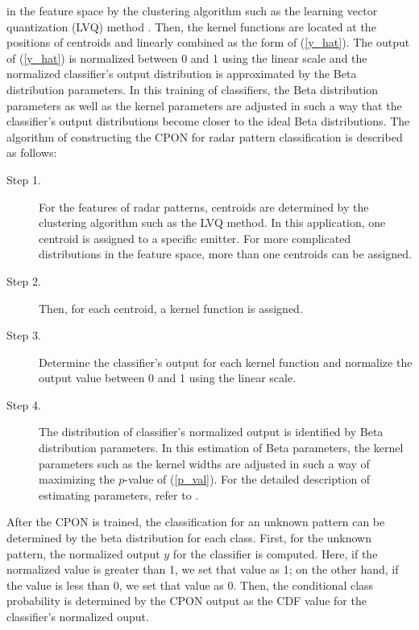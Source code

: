 \documentclass[runningheads,a4paper]{llncs}
\begin{document}
in the feature space by the clustering algorithm such as the learning vector quantization (LVQ) method \cite{Koh90}. 
Then, the kernel functions are located at the positions of centroids and
linearly combined as the form of (\ref{y_hat}). The output of (\ref{y_hat}) is normalized between 0 and 1 using the linear scale and 
the normalized classifier's output distribution is approximated by the Beta distribution parameters.
In this training of classifiers, the Beta distribution parameters as well as the kernel parameters are adjusted
in such a way that the classifier's output distributions become closer to the ideal Beta distributions. 
The algorithm of constructing the CPON for radar pattern classification is described as follows:
\begin{description}
\item[Step 1.] For the features of radar patterns, centroids are determined by the clustering algorithm such as the LVQ method.
  In this application, one centroid is assigned to a specific emitter. For more complicated distributions in the feature space, more than one
  centroids can be assigned.
\item[Step 2.] Then, for each centroid, a kernel function is assigned.
\item[Step 3.] Determine the classifier's output for each kernel function and normalize the output value between 0 and 1 using the linear scale.
\item[Step 4.] The distribution of classifier's normalized output is identified by Beta distribution parameters. In this estimation of
  Beta parameters, the kernel parameters such as the kernel widths are adjusted in such a way of maximizing the $p$-value of (\ref{p_val}).
  For the detailed description of estimating parameters, refer to \cite{cit:PK}.
\end{description}

After the CPON is trained, the classification for an unknown pattern can be determined by the beta distribution for each class.
First, for the unknown pattern, the normalized output $y$ for the classifier is computed.
Here, if the normalized value is greater than 1, we set that value as 1; on the other hand, if the value is less than 0, we set that value as 0.
Then, the conditional class probability is
determined by the CPON output as the CDF value for the classifier's normalized ouput.
\end{document}
